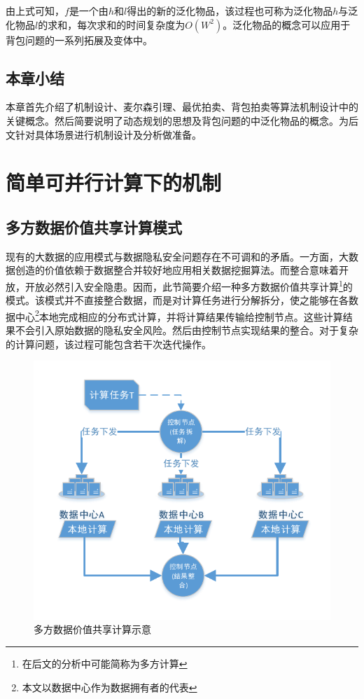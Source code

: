 \documentclass[promaster]{thesis-uestc}
\begin{document}
由上式可知，$f$是一个由$h$和$l$得出的新的泛化物品，该过程也可称为泛化物品$h$与泛化物品$l$的求和，每次求和的时间复杂度为$O(W^2)$。泛化物品的概念可以应用于背包问题的一系列拓展及变体中。

\section{本章小结}
本章首先介绍了机制设计、麦尔森引理、最优拍卖、背包拍卖等算法机制设计中的关键概念。然后简要说明了动态规划的思想及背包问题的中泛化物品的概念。为后文针对具体场景进行机制设计及分析做准备。

\chapter{简单可并行计算下的机制}
\section{多方数据价值共享计算模式}
现有的大数据的应用模式与数据隐私安全问题存在不可调和的矛盾。一方面，大数据创造的价值依赖于数据整合并较好地应用相关数据挖掘算法。而整合意味着开放，开放必然引入安全隐患。因而，此节简要介绍一种多方数据价值共享计算\footnote{在后文的分析中可能简称为多方计算}的模式。该模式并不直接整合数据，而是对计算任务进行分解拆分，使之能够在各数据中心\footnote{本文以数据中心作为数据拥有者的代表}本地完成相应的分布式计算，并将计算结果传输给控制节点。这些计算结果不会引入原始数据的隐私安全风险。然后由控制节点实现结果的整合。对于复杂的计算问题，该过程可能包含若干次迭代操作。
\begin{figure}[h]
\includegraphics[width=350pt]{pic/yuanweishiyi.pdf}
\caption{多方数据价值共享计算示意}
\label{yuanweishiyi}
\end{figure}
\end{document}
